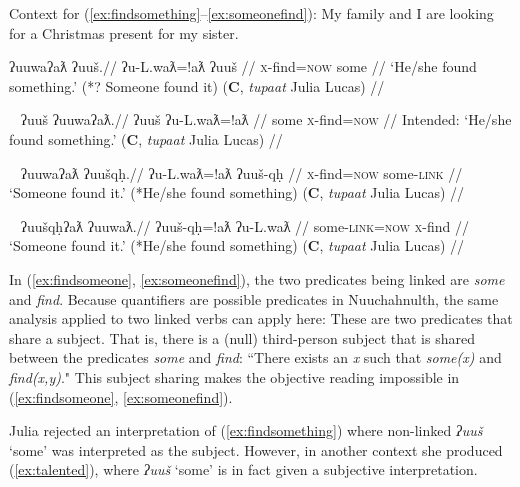 \vspace{5pt}

\noindent Context for (\ref{ex:findsomething}--\ref{ex:someonefind}): My family and I are looking for a Christmas present for my sister.

\ex \label{ex:findsomething}
\begingl
\glpreamble ʔuuwaʔaƛ ʔuuš.//
\gla ʔu-L.waƛ=!aƛ ʔuuš //
\glb \textsc{x}-find=\textsc{now} some //
\glft `He/she found something.' (*? Someone found it) (\textbf{C}, \textit{tupaat} Julia Lucas) //
\endgl
\xe

\ex~ \label{ex:*findsomething}
\begingl
\glpreamble *ʔuuš ʔuuwaʔaƛ.//
\gla ʔuuš ʔu-L.waƛ=!aƛ //
\glb some \textsc{x}-find=\textsc{now} //
\glft Intended: `He/she found something.' (\textbf{C}, \textit{tupaat} Julia Lucas) //
\endgl
\xe

\ex~ \label{ex:findsomeone}
\begingl
\glpreamble ʔuuwaʔaƛ ʔuušqḥ.//
\gla ʔu-L.waƛ=!aƛ ʔuuš-qḥ //
\glb \textsc{x}-find=\textsc{now} some-\textsc{link} //
\glft `Someone found it.' (*He/she found something) (\textbf{C}, \textit{tupaat} Julia Lucas) //
\endgl
\xe

\ex~ \label{ex:someonefind}
\begingl
\glpreamble ʔuušqḥʔaƛ ʔuuwaƛ.//
\gla ʔuuš-qḥ=!aƛ ʔu-L.waƛ //
\glb some-\textsc{link}=\textsc{now} \textsc{x}-find //
\glft `Someone found it.' (*He/she found something) (\textbf{C}, \textit{tupaat} Julia Lucas) //
\endgl
\xe

\begin{comment}
\ex \label{ex:someonefind2}
\begingl
\glpreamble ʔuušqḥ ʔuuwaʔaƛ.//
\gla ʔuuš-qḥ ʔu-L.waƛ=!aƛ //
\glb some-\textsc{link} \textsc{x}-find=\textsc{now} //
\glft `Someone found it.' (*He/she found something) //
\endgl
\xe
\end{comment}

In (\ref{ex:findsomeone}, \ref{ex:someonefind}), the two predicates being linked are \textit{some} and \textit{find}. Because quantifiers are possible predicates in Nuuchahnulth, the same analysis applied to two linked verbs can apply here: These are two predicates that share a subject. That is, there is a (null) third-person subject that is shared between the predicates \textit{some} and \textit{find}: ``There exists an \textit{x} such that \textit{some(x)} and \textit{find(x,y)}." This subject sharing makes the objective reading impossible in (\ref{ex:findsomeone}, \ref{ex:someonefind}).

Julia rejected an interpretation of (\ref{ex:findsomething}) where non-linked \textit{ʔuuš} `some' was interpreted as the subject. However, in another context she produced (\ref{ex:talented}), where \textit{ʔuuš} `some' is in fact given a subjective interpretation.

